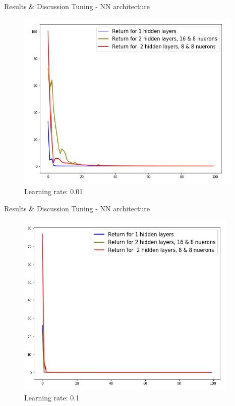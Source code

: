 \documentclass{beamer}
\begin{document}
\begin{frame}{Results \& Discussion }{Tuning - NN architecture\vphantom{(y}}
\vspace{-0.7em}
\begin{figure}
  \includegraphics[scale=0.7]{images/lr_med_a.JPG}
  \caption{Learning rate: 0.01}
\end{figure}
\end{frame}

\begin{frame}{Results \& Discussion }{Tuning - NN architecture\vphantom{(y}}
\vspace{-0.7em}
\begin{figure}
  \includegraphics[scale=0.7]{images/lr_high_a.JPG}
  \caption{Learning rate: 0.1}
\end{figure}
\end{frame}
\end{document}
